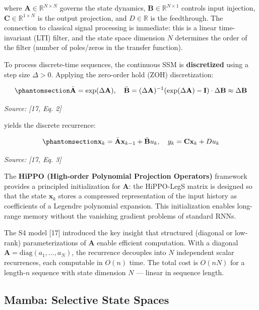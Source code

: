 where \(\mathbf{A} \in \mathbb{R}^{N \times N}\) governs the state dynamics, \(\mathbf{B} \in \mathbb{R}^{N \times 1}\) controls input injection, \(\mathbf{C} \in \mathbb{R}^{1 \times N}\) is the output projection, and \(D \in \mathbb{R}\) is the feedthrough. The connection to classical signal processing is immediate: this is a linear time-invariant (LTI) filter, and the state space dimension \(N\) determines the order of the filter (number of poles/zeros in the transfer function).

To process discrete-time sequences, the continuous SSM is \textbf{discretized} using a step size \(\Delta > 0\). Applying the zero-order hold (ZOH) discretization:

\begin{equation}\protect\phantomsection\label{eq:ssm-zoh}{\bar{\mathbf{A}} = \exp(\Delta \mathbf{A}), \quad \bar{\mathbf{B}} = (\Delta \mathbf{A})^{-1}(\exp(\Delta \mathbf{A}) - \mathbf{I}) \cdot \Delta \mathbf{B} \approx \Delta \mathbf{B}
}\end{equation} \par{\small\textit{Source: [17, Eq. 2]}}

yields the discrete recurrence:

\begin{equation}\protect\phantomsection\label{eq:ssm-discrete}{\mathbf{x}_k = \bar{\mathbf{A}} \mathbf{x}_{k-1} + \bar{\mathbf{B}} u_k, \quad y_k = \mathbf{C} \mathbf{x}_k + D u_k
}\end{equation} \par{\small\textit{Source: [17, Eq. 3]}}

The \textbf{HiPPO (High-order Polynomial Projection Operators)} framework provides a principled initialization for \(\mathbf{A}\): the HiPPO-LegS matrix is designed so that the state \(\mathbf{x}_k\) stores a compressed representation of the input history as coefficients of a Legendre polynomial expansion. This initialization enables long-range memory without the vanishing gradient problems of standard RNNs.

The S4 model {[}17{]} introduced the key insight that structured (diagonal or low-rank) parameterizations of \(\mathbf{A}\) enable efficient computation. With a diagonal \(\mathbf{A} = \text{diag}(a_1, \dots, a_N)\), the recurrence decouples into \(N\) independent scalar recurrences, each computable in \(O(n)\) time. The total cost is \(O(nN)\) for a length-\(n\) sequence with state dimension \(N\) --- linear in sequence length.

\subsection{Mamba: Selective State Spaces}\label{sec:mamba-selective-state-spaces}

